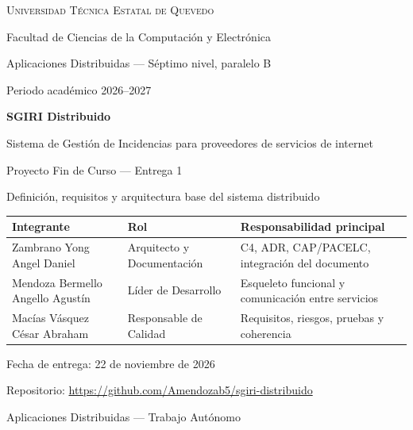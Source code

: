 \documentclass[11pt,a4paper]{article}
\newcommand{\repo}{\url{https://github.com/Amendozab5/sgiri-distribuido}}
\begin{document}
\hypersetup{pageanchor=false}
\begin{titlepage}
\centering
{\large\scshape Universidad Técnica Estatal de Quevedo\par}
\vspace{0.2cm}
{\normalsize Facultad de Ciencias de la Computación y Electrónica\par}
\vspace{0.6cm}
{\normalsize Aplicaciones Distribuidas --- Séptimo nivel, paralelo B\par}
{\normalsize Periodo académico 2026--2027\par}
\vspace{1.8cm}
{\Huge\bfseries SGIRI Distribuido\par}
\vspace{0.5cm}
{\Large Sistema de Gestión de Incidencias para proveedores de servicios de internet\par}
\vspace{0.4cm}
{\large Proyecto Fin de Curso --- Entrega 1\par}
{\normalsize Definición, requisitos y arquitectura base del sistema distribuido\par}
\vspace{1.5cm}

{\small
\begin{tabularx}{\linewidth}{@{}l l Y@{}}
\toprule
\textbf{Integrante} & \textbf{Rol} & \textbf{Responsabilidad principal} \\
\midrule
Zambrano Yong Angel Daniel & Arquitecto y Documentación & C4, ADR, CAP/PACELC, integración del documento \\
Mendoza Bermello Angello Agustín & Líder de Desarrollo & Esqueleto funcional y comunicación entre servicios \\
Macías Vásquez César Abraham & Responsable de Calidad & Requisitos, riesgos, pruebas y coherencia \\
\bottomrule
\end{tabularx}}

\vspace{1.5cm}
{\normalsize Fecha de entrega: 22 de noviembre de 2026\par}
\vspace{0.3cm}
{\normalsize Repositorio: \repo\par}
\vspace{1.0cm}
{\small Aplicaciones Distribuidas --- Trabajo Autónomo\par}
\end{titlepage}
\hypersetup{pageanchor=true}
\end{document}
